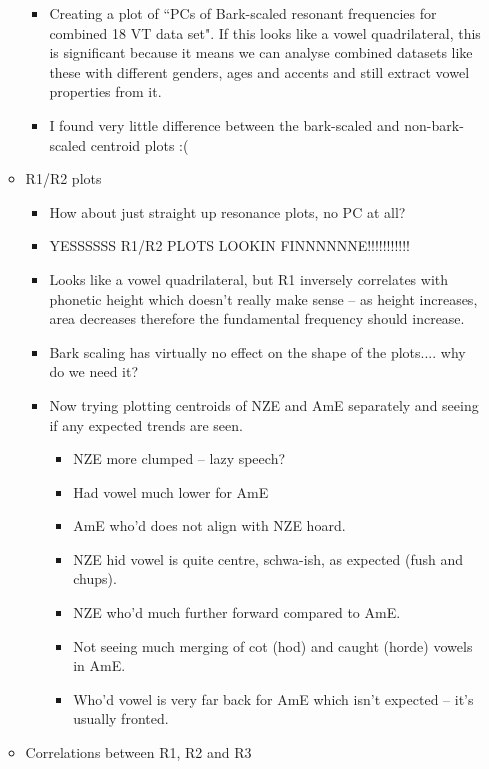 \documentclass{article}
\begin{document}
\begin{itemize}
\begin{itemize}
        \begin{itemize}
            \item Creating a plot of ``PCs of Bark-scaled resonant frequencies for combined 18 VT data set". If this looks like a vowel quadrilateral, this is significant because it means we can analyse combined datasets like these with different genders, ages and accents and still extract vowel properties from it. 
            \item I found very little difference between the bark-scaled and non-bark-scaled centroid plots :(
        \end{itemize}
        \item R1/R2 plots
        \begin{itemize}
            \item How about just straight up resonance plots, no PC at all?
            \item YESSSSSS R1/R2 PLOTS LOOKIN FINNNNNNE!!!!!!!!!!!
            \item Looks like a vowel quadrilateral, but R1 inversely correlates with phonetic height which doesn’t really make sense – as height increases, area decreases therefore the fundamental frequency should increase.
            \item Bark scaling has virtually no effect on the shape of the plots.... why do we need it?
            \item Now trying plotting centroids of NZE and AmE separately and seeing if any expected trends are seen.
            \begin{itemize}
                \item NZE more clumped – lazy speech?
                \item Had vowel much lower for AmE
                \item AmE who’d does not align with NZE hoard.
                \item NZE hid vowel is quite centre, schwa-ish, as expected (fush and chups).
                \item NZE who’d much further forward compared to AmE.
                \item Not seeing much merging of cot (hod) and caught (horde) vowels in AmE.
                \item Who’d vowel is very far back for AmE which isn’t expected – it’s usually fronted.
            \end{itemize}
        \end{itemize}
        \item Correlations between R1, R2 and R3

\end{itemize}
\end{itemize}
\end{document}
